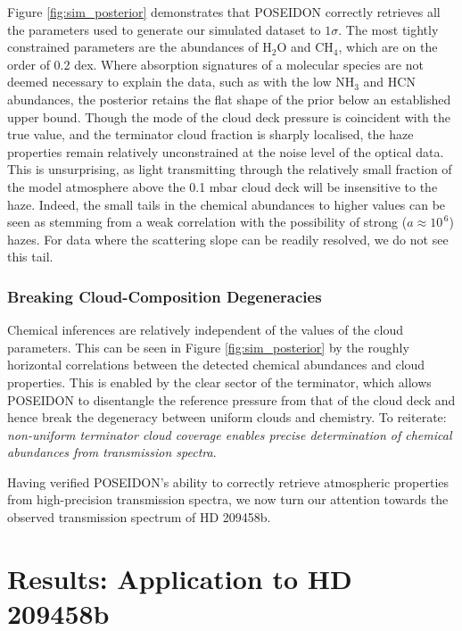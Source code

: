 \documentclass[fleqn,usenatbib]{mnras}
\begin{document}
Figure \ref{fig:sim_posterior} demonstrates that POSEIDON correctly retrieves all the parameters used to generate our simulated dataset to $1\sigma$. The most tightly constrained parameters are the abundances of $\mathrm{H_{2}O}$ and $\mathrm{CH_{4}}$, which are on the order of 0.2 dex. Where absorption signatures of a molecular species are not deemed necessary to explain the data, such as with the low $\mathrm{NH_{3}}$ and $\mathrm{HCN}$ abundances, the posterior retains the flat shape of the prior below an established upper bound. Though the mode of the cloud deck pressure is coincident with the true value, and the terminator cloud fraction is sharply localised, the haze properties remain relatively unconstrained at the noise level of the optical data. This is unsurprising, as light transmitting through the relatively small fraction of the model atmosphere above the 0.1 mbar cloud deck will be insensitive to the haze. Indeed, the small tails in the chemical abundances to higher values can be seen as stemming from a weak correlation with the possibility of strong ($a \approx 10^{\, 6}$) hazes. For data where the scattering slope can be readily resolved, we do not see this tail.

\subsubsection{Breaking Cloud-Composition Degeneracies}\label{subsubsection:cloud_degeneracy}

Chemical inferences are relatively independent of the values of the cloud parameters. This can be seen in Figure \ref{fig:sim_posterior} by the roughly horizontal correlations between the detected chemical abundances and cloud properties. This is enabled by the clear sector of the terminator, which allows POSEIDON to disentangle the reference pressure from that of the cloud deck and hence break the degeneracy between uniform clouds and chemistry. To reiterate: \emph{non-uniform terminator cloud coverage enables precise determination of chemical abundances from transmission spectra}.

Having verified POSEIDON's ability to correctly retrieve atmospheric properties from high-precision transmission spectra, we now turn our attention towards the observed transmission spectrum of HD 209458b.

\section{Results: Application to HD 209458b}\label{section:results}
\end{document}
